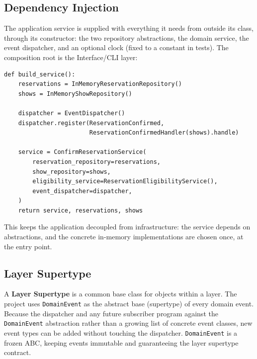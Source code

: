 \documentclass[11pt,a4paper]{article}
\newcommand{\code}[1]{\texttt{#1}}
\begin{document}
\subsection{Dependency Injection}

The application service is supplied with everything it needs from outside its
class, through its constructor: the two repository abstractions, the domain
service, the event dispatcher, and an optional clock (fixed to a constant in
tests). The composition root is the Interface/CLI layer:

\begin{lstlisting}[style=python,caption={Composition root in \code{cli.py}\ --- dependencies injected from outside the service.},label=lst:di]
def build_service():
    reservations = InMemoryReservationRepository()
    shows = InMemoryShowRepository()

    dispatcher = EventDispatcher()
    dispatcher.register(ReservationConfirmed,
                        ReservationConfirmedHandler(shows).handle)

    service = ConfirmReservationService(
        reservation_repository=reservations,
        show_repository=shows,
        eligibility_service=ReservationEligibilityService(),
        event_dispatcher=dispatcher,
    )
    return service, reservations, shows
\end{lstlisting}

This keeps the application decoupled from infrastructure: the service depends
on abstractions, and the concrete in-memory implementations are chosen once, at
the entry point.

\subsection{Layer Supertype}

A \textbf{Layer Supertype} is a common base class for objects within a layer.
The project uses \code{DomainEvent} as the abstract base (supertype) of every
domain event. Because the dispatcher and any future subscriber program against
the \code{DomainEvent} abstraction rather than a growing list of concrete event
classes, new event types can be added without touching the dispatcher.
\code{DomainEvent} is a frozen ABC, keeping events immutable and guaranteeing
the layer supertype contract.

\end{document}
